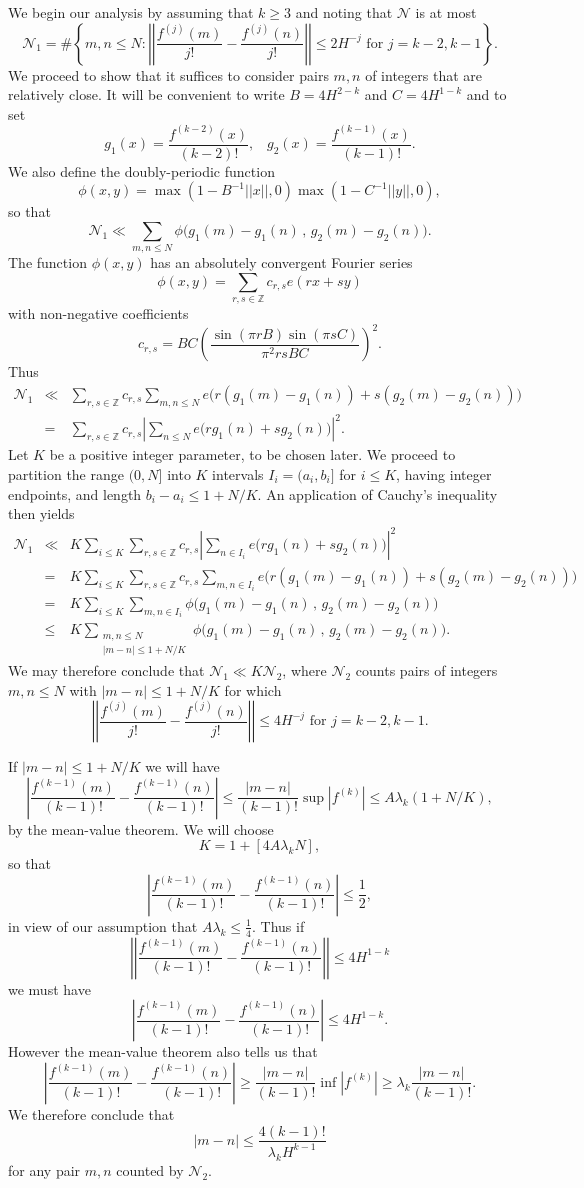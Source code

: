 \documentclass[a4paper,10pt]{article}
\newcommand{\Z}{\mathbb{Z}}
\newcommand{\twosum}[2]{\sum_{\substack{#1\\#2}}}
\newcommand{\lk}{\lambda_k}
\begin{document}
We begin our analysis by assuming that $k\ge 3$ and noting that
$\mathcal{N}$ is at most
\[\mathcal{N}_1=\#\left\{m,n\le N:
\left|\left|\frac{f^{(j)}(m)}{j!}-\frac{f^{(j)}(n)}{j!}\right|\right|
\le 2H^{-j}\mbox{ for } j=k-2, k-1\right\}.\]
We proceed to show that it suffices to consider pairs $m,n$ of integers that
are relatively close. It will be convenient to write $B=4H^{2-k}$ and
$C=4H^{1-k}$ and to set
\[g_1(x)=\frac{f^{(k-2)}(x)}{(k-2)!},\;\;\; g_2(x)=\frac{f^{(k-1)}(x)}{(k-1)!}.\]
We also define the doubly-periodic function
\[\phi(x,y)=\max\left(1-B^{-1}||x||,0\right)\max\left(1-C^{-1}||y||,0\right),\]
so that
\[\mathcal{N}_1\ll \sum_{m,n\le N}
\phi\big(g_1(m)-g_1(n)\,,\, g_2(m)-g_2(n)\big).\]
The function $\phi(x,y)$ has an absolutely convergent Fourier series
\[\phi(x,y)=\sum_{r,s\in\Z}c_{r,s}e(rx+sy)\]
with non-negative coefficients
\[c_{r,s}=BC\left(\frac{\sin(\pi rB)\sin(\pi sC)}{\pi^2
    rsBC}\right)^2.\]
Thus
\begin{eqnarray*}
\mathcal{N}_1&\ll& \sum_{r,s\in\Z}c_{r,s}\sum_{m,n\le N}
e\big(r(g_1(m)-g_1(n))+s(g_2(m)-g_2(n))\big)\\
&=& \sum_{r,s\in\Z}c_{r,s}\left|\sum_{n\le N}
e\big(rg_1(n)+sg_2(n)\big)\right|^2.
\end{eqnarray*}
Let $K$ be a positive integer parameter, to be chosen later.
We proceed to partition the range $(0,N]$ into $K$ intervals
$I_i=(a_i,b_i]$ for $i\le K$, having integer endpoints, and length
$b_i-a_i\le 1+N/K$.  An application of Cauchy's inequality then yields
\begin{eqnarray*}
\mathcal{N}_1 &\ll & K\sum_{i\le K}\sum_{r,s\in\Z}c_{r,s}
\left|\sum_{n\in I_i}e\big(rg_1(n)+sg_2(n)\big)\right|^2\\
&=&K\sum_{i\le K}\sum_{r,s\in\Z}c_{r,s}\sum_{m,n\in I_i}
e\big(r(g_1(m)-g_1(n))+s(g_2(m)-g_2(n))\big)\\
&=&K\sum_{i\le K}\sum_{m,n\in I_i}
\phi\big(g_1(m)-g_1(n)\,,\, g_2(m)-g_2(n)\big)\\
&\le & K\twosum{m,n\le N}{|m-n|\le 1+N/K}
\phi\big(g_1(m)-g_1(n)\,,\, g_2(m)-g_2(n)\big).
\end{eqnarray*}
We may therefore conclude that $\mathcal{N}_1\ll K\mathcal{N}_2$,
where $\mathcal{N}_2$ counts pairs of integers $m,n\le N$ with 
$|m-n|\le 1+N/K$ for which
\[\left|\left|\frac{f^{(j)}(m)}{j!}-\frac{f^{(j)}(n)}{j!}\right|\right|
\le 4H^{-j}\mbox{ for } j=k-2, k-1.\]

If $|m-n|\le 1+N/K$ we will have
\[\left|\frac{f^{(k-1)}(m)}{(k-1)!}-\frac{f^{(k-1)}(n)}{(k-1)!}\right|\le
\frac{|m-n|}{(k-1)!}\sup |f^{(k)}|\le A\lk(1+N/K),\]
by the mean-value theorem. We will choose
\[K=1+[4A\lk N],\]
so that
\[\left|\frac{f^{(k-1)}(m)}{(k-1)!}-\frac{f^{(k-1)}(n)}{(k-1)!}\right|\le
\frac{1}{2},\]
in view of our assumption that $A\lk\le\tfrac14$. Thus if
\[\left|\left|\frac{f^{(k-1)}(m)}{(k-1)!}-
\frac{f^{(k-1)}(n)}{(k-1)!}\right|\right|\le 4H^{1-k}\]
we must have
\[\left|\frac{f^{(k-1)}(m)}{(k-1)!}-\frac{f^{(k-1)}(n)}{(k-1)!}\right|
\le 4H^{1-k}.\]
However the mean-value theorem also tells us that
\[\left|\frac{f^{(k-1)}(m)}{(k-1)!}-\frac{f^{(k-1)}(n)}{(k-1)!}\right|\ge
\frac{|m-n|}{(k-1)!}\inf |f^{(k)}|\ge \lk\frac{|m-n|}{(k-1)!}.\]
We therefore conclude that
\[|m-n|\le \frac{4(k-1)!}{\lk H^{k-1}}\]
for any pair $m,n$ counted by $\mathcal{N}_2$.
\end{document}
